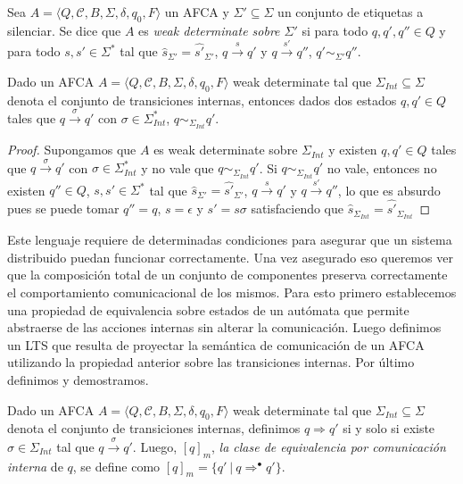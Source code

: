 \begin{definition}
Sea $A= \langle Q, \mathcal{C}, B, \Sigma, \delta, q_0, F \rangle$ un AFCA y $\Sigma' \subseteq \Sigma$ un conjunto de etiquetas a silenciar. Se dice que $A$ es \emph{weak determinate sobre $\Sigma'$} si para todo $q, q', q'' \in Q$ y para todo $s, s' \in \Sigma^*$ tal que $\widehat{s}_{\Sigma'} = \widehat{s'}_{\Sigma'}$, $q \xrightarrow{s} q'$ y $q \xrightarrow{s'} q''$, $q' \sim_{\Sigma'} q''$.
\end{definition}

\begin{prop}
Dado un AFCA $A = \langle Q, \mathcal{C}, B, \Sigma, \delta, q_0, F \rangle$ weak determinate tal que $\Sigma_\mathit{Int} \subseteq \Sigma$ denota el conjunto de transiciones internas, entonces dados dos estados $q, q' \in Q$ tales que $q \xrightarrow{\sigma} q'$ con $\sigma \in \Sigma_{\mathit{Int}}^*$,  $q \sim_{\Sigma_\mathit{Int}} q'$.
\end{prop}
\begin{proof}
Supongamos que $A$ es weak determinate sobre $\Sigma_\mathit{Int}$ y existen $q, q' \in Q$ tales que $q \xrightarrow{\sigma} q'$ con $\sigma \in \Sigma_{\mathit{Int}}^*$ y no vale que $q \sim_{\Sigma_\mathit{Int}} q'$. Si $q \sim_{\Sigma_\mathit{Int}} q'$ no vale, entonces no existen $q'' \in Q$,  $s, s' \in \Sigma^*$ tal que $\widehat{s}_{\Sigma'} = \widehat{s'}_{\Sigma'}$, $q \xrightarrow{s} q'$ y $q \xrightarrow{s'} q''$, lo que es absurdo pues se puede tomar $q'' = q$, $s = \epsilon$ y $s' = s\sigma$ satisfaciendo que $\widehat{s}_{\Sigma_\mathit{Int}} = \widehat{s'}_{\Sigma_\mathit{Int}}$
\end{proof}

Este lenguaje requiere de determinadas condiciones para asegurar que un sistema distribuido puedan funcionar correctamente. Una vez asegurado eso queremos ver que la composición total de un conjunto de componentes preserva correctamente el comportamiento comunicacional de los mismos. Para esto primero establecemos una propiedad de equivalencia sobre estados de un autómata que permite abstraerse de las acciones internas sin alterar la comunicación. Luego definimos un LTS que resulta de proyectar la semántica de comunicación de un AFCA utilizando la propiedad anterior sobre las transiciones internas. Por último definimos y demostramos.

\begin{definition} \label{def:eci}
Dado un AFCA $A = \langle Q, \mathcal{C}, B, \Sigma, \delta, q_0, F \rangle$ weak determinate tal que $\Sigma_\mathit{Int} \subseteq \Sigma$ denota el conjunto de transiciones internas, definimos $q \Rightarrow q'$ si y solo si existe $\sigma \in \Sigma_\mathit{Int}$ tal que $q \xrightarrow{\sigma} q'$. Luego, $[q]_m$, \emph{la clase de equivalencia por comunicación interna} de $q$, se define como $[q]_m = \{q'\ |\ q \Rightarrow^\bullet q'\}$. 
\end{definition}

